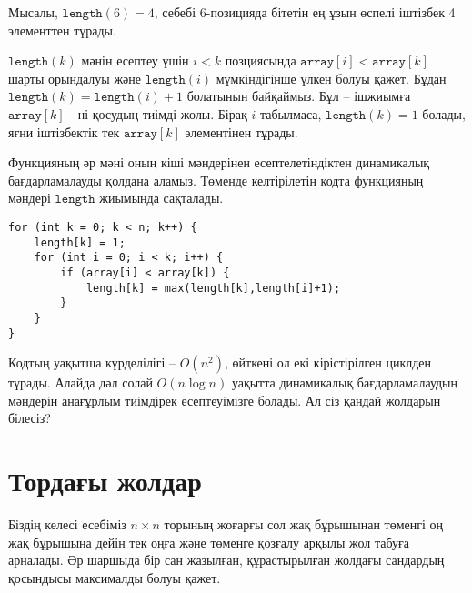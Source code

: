 Мысалы, $\texttt{length}(6)=4$, себебі
6-позицияда бітетін ең ұзын өспелі іштізбек
4 элементтен тұрады.

$\texttt{length}(k)$ мәнін есептеу үшін
$i<k$ позциясында $\texttt{array}[i]<\texttt{array}[k]$
шарты орындалуы және $\texttt{length}(i)$ мүмкіндігінше
үлкен болуы қажет.
Бұдан
$\texttt{length}(k)=\texttt{length}(i)+1$ болатынын байқаймыз.
Бұл -- ішжиымға $\texttt{array}[k]$ - ні
қосудың тиімді жолы.
Бірақ $i$ табылмаса, $\texttt{length}(k)=1$ болады,
яғни іштізбектік тек $\texttt{array}[k]$ элементінен тұрады. 

Функцияның әр мәні оның кіші мәндерінен есептелетіндіктен
динамикалық бағдарламалауды қолдана аламыз. 
Төменде келтірілетін кодта функцияның мәндері $\texttt{length}$ 
жиымында сақталады.

\begin{lstlisting}
for (int k = 0; k < n; k++) {
    length[k] = 1;
    for (int i = 0; i < k; i++) {
        if (array[i] < array[k]) {
            length[k] = max(length[k],length[i]+1);
        }
    }
}
\end{lstlisting}

Кодтың уақытша күрделілігі -- $O(n^2)$, өйткені ол
екі кірістірілген циклден тұрады. 
Алайда дәл солай $O(n \log n)$ уақытта динамикалық бағдарламалаудың мәндерін анағұрлым тиімдірек 
есептеуімізге болады.
Ал сіз қандай жолдарын білесіз?

\section{Тордағы жолдар}

Біздің келесі есебіміз 
$n \times n$ торының жоғарғы сол жақ бұрышынан
төменгі оң жақ бұрышына дейін тек оңға және төменге
қозғалу арқылы жол табуға арналады. Әр 
шаршыда бір сан жазылған,
құрастырылған жолдағы сандардың
қосындысы максималды болуы қажет. 

